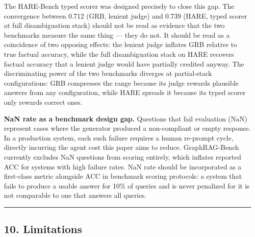 \documentclass[
]{article}
\begin{document}
The HARE-Bench typed scorer was designed precisely to close this gap.
The convergence between 0.712 (GRB, lenient judge) and 0.739 (HARE,
typed scorer at full disambiguation stack) should not be read as
evidence that the two benchmarks measure the same thing --- they do not.
It should be read as a coincidence of two opposing effects: the lenient
judge inflates GRB relative to true factual accuracy, while the full
disambiguation stack on HARE recovers factual accuracy that a lenient
judge would have partially credited anyway. The discriminating power of
the two benchmarks diverges at partial-stack configurations: GRB
compresses the range because its judge rewards plausible answers from
any configuration, while HARE spreads it because its typed scorer only
rewards correct ones.

\textbf{NaN rate as a benchmark design gap.} Questions that fail
evaluation (NaN) represent cases where the generator produced a
non-compliant or empty response. In a production system, each such
failure requires a human re-prompt cycle, directly incurring the agent
cost this paper aims to reduce. GraphRAG-Bench currently excludes NaN
questions from scoring entirely, which inflates reported ACC for systems
with high failure rates. NaN rate should be incorporated as a
first-class metric alongside ACC in benchmark scoring protocols: a
system that fails to produce a usable answer for 10\% of queries and is
never penalized for it is not comparable to one that answers all
queries.

\begin{center}\rule{0.5\linewidth}{0.5pt}\end{center}

\subsection{10. Limitations}\label{limitations}
\end{document}
